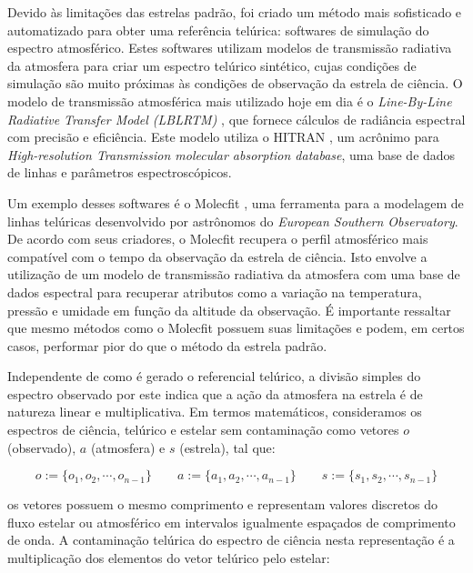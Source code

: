 Devido às limitações das estrelas padrão, foi criado um método mais sofisticado e automatizado para obter uma referência telúrica: softwares de simulação do espectro atmosférico. Estes softwares utilizam modelos de transmissão radiativa da atmosfera para criar um espectro telúrico sintético, cujas condições de simulação são muito próximas às condições de observação da estrela de ciência. O modelo de transmissão atmosférica mais utilizado hoje em dia é o \textit{Line-By-Line Radiative Transfer Model (LBLRTM)} \citep{2005JQSRT..91..233C}, que fornece cálculos de radiância espectral com precisão e eficiência. Este modelo utiliza o HITRAN \citep{rothman2009hitran}, um acrônimo para \textit{High-resolution Transmission molecular absorption database}, uma base de dados de linhas e parâmetros espectroscópicos. 

Um exemplo desses softwares é o Molecfit \citep{smette2015molecfit}, uma ferramenta para a modelagem de linhas telúricas desenvolvido por astrônomos do \textit{European Southern Observatory}. De acordo com seus criadores, o Molecfit recupera o perfil atmosférico mais compatível com o tempo da observação da estrela de ciência. Isto envolve a utilização de um modelo de transmissão radiativa da atmosfera com uma base de dados espectral para recuperar atributos como a variação na temperatura, pressão e umidade em função da altitude da observação. É importante ressaltar que mesmo métodos como o Molecfit possuem suas limitações e podem, em certos casos, performar pior do que o método da estrela padrão.

Independente de como é gerado o referencial telúrico, a divisão simples do espectro observado por este indica que a ação da atmosfera na estrela é de natureza linear e multiplicativa. Em termos matemáticos, consideramos os espectros de ciência, telúrico e estelar sem contaminação como vetores $o$ (observado), $a$ (atmosfera) e $s$ (estrela), tal que:

\begin{equation*}
    o := \{o_1, o_2, \cdots, o_{n-1}\} \qquad a := \{a_1, a_2, \cdots, a_{n-1}\} \qquad s := \{s_1, s_2, \cdots, s_{n-1}\} 
\end{equation*}

os vetores possuem o mesmo comprimento e representam valores discretos do fluxo estelar ou atmosférico em intervalos igualmente espaçados de comprimento de onda. A contaminação telúrica do espectro de ciência nesta representação é a multiplicação dos elementos do vetor telúrico pelo estelar:

